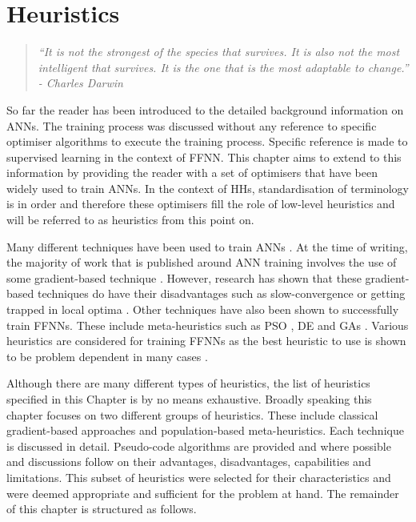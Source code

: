 \chapter{Heuristics}
\label{chap:heuristics}

\begin{quotation}
    \textit{``It is not the strongest of the species that survives. It is also not the most intelligent that survives. It is the one that is the most adaptable to change.'' - Charles Darwin}
\end{quotation}

So far the reader has been introduced to the detailed background information on \acp{ANN}. The training process was discussed without any reference to specific optimiser algorithms to execute the training process. Specific reference is made to supervised learning in the context of \ac{FFNN}. This chapter aims to extend to this information by providing the reader with a set of optimisers that have been widely used to train \acp{ANN}. In the context of \acp{HH}, standardisation of terminology is in order and therefore these optimisers fill the role of low-level heuristics and will be referred to as heuristics from this point on.

Many different techniques have been used to train \acp{ANN} \cite{ref:kingma:2014}.  At the time of writing, the majority of work that is published around \ac{ANN} training involves the use of some gradient-based technique \cite{ref:nel:2021}. However, research has shown that these gradient-based techniques do have their disadvantages such as slow-convergence or getting trapped in local optima \cite{ref:mingguang:2009}. Other techniques have also been shown to successfully train \acp{FFNN}. These include meta-heuristics such as  \ac{PSO} \cite{ref:rakitianskaia:2012}\cite{ref:vanwyk:2014}, \ac{DE} \cite{ref:espinal:2011} and \acp{GA} \cite{ref:gupta:1999}. Various heuristics are considered for training \acp{FFNN} as the best heuristic to use is shown to be problem dependent in many cases \cite{ref:kheiri:2017}.

Although there are many different types of heuristics, the list of heuristics specified in this Chapter is by no means exhaustive. Broadly speaking this chapter focuses on two different groups of heuristics. These include classical gradient-based approaches and population-based meta-heuristics. Each technique is discussed in detail. Pseudo-code algorithms are provided and where possible and discussions follow on their advantages, disadvantages, capabilities and limitations. This subset of heuristics were selected for their characteristics and were deemed appropriate and sufficient for the problem at hand. The remainder of this chapter is structured as follows.

